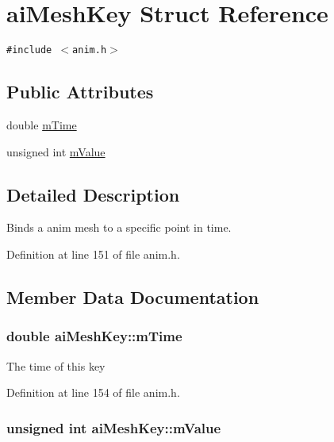 \hypertarget{structai_mesh_key}{
\section{aiMeshKey Struct Reference}
\label{structai_mesh_key}
}
{\tt \#include $<$anim.h$>$}

\subsection*{Public Attributes}
\begin{CompactItemize}
\item 
double \hyperlink{structai_mesh_key_0814e4b14ed162295ba19331410a51ab}{mTime}
\item 
unsigned int \hyperlink{structai_mesh_key_bdd5914697609a9d876f63b6ca090a18}{mValue}
\end{CompactItemize}


\subsection{Detailed Description}
Binds a anim mesh to a specific point in time. 

Definition at line 151 of file anim.h.

\subsection{Member Data Documentation}
\hypertarget{structai_mesh_key_0814e4b14ed162295ba19331410a51ab}{
\subsubsection[mTime]{\setlength{\rightskip}{0pt plus 5cm}double {\bf aiMeshKey::mTime}}}
\label{structai_mesh_key_0814e4b14ed162295ba19331410a51ab}


The time of this key 

Definition at line 154 of file anim.h.\hypertarget{structai_mesh_key_bdd5914697609a9d876f63b6ca090a18}{
\subsubsection[mValue]{\setlength{\rightskip}{0pt plus 5cm}unsigned int {\bf aiMeshKey::mValue}}}
\label{structai_mesh_key_bdd5914697609a9d876f63b6ca090a18}


